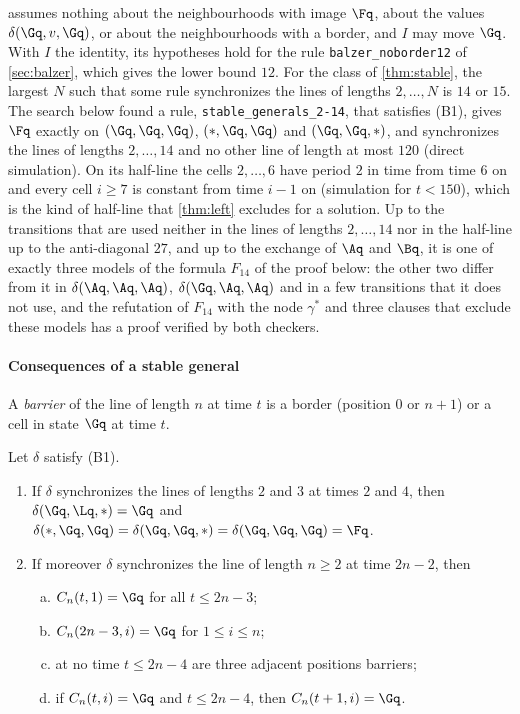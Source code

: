  assumes nothing about the neighbourhoods with image
$\Fq$, about the values $\delta(\Gq,v,\Gq)$, or about the neighbourhoods with a
border, and $I$ may move $\Gq$. With $I$ the identity, its hypotheses hold for the rule
\texttt{balzer\_noborder12} of \cref{sec:balzer}, which gives the lower bound
$12$. For the class of \cref{thm:stable}, the largest $N$ such that some rule
synchronizes the lines of lengths $2,\dots,N$ is $14$ or $15$. The search below
found a rule, \texttt{stable\_generals\_2-14},
that satisfies (B1), gives $\Fq$ exactly on $(\Gq,\Gq,\Gq)$, $(\ast,\Gq,\Gq)$
and $(\Gq,\Gq,\ast)$, and synchronizes the lines of lengths $2,\dots,14$ and no
other line of length at most $120$ (direct simulation). On its half-line the
cells $2,\dots,6$ have period $2$ in time from time $6$ on and every cell $i\ge7$
is constant from time $i-1$ on (simulation for $t<150$), which is the kind of
half-line that \cref{thm:left} excludes for a solution. Up to the transitions
that are used neither in the lines of lengths $2,\dots,14$ nor in the half-line
up to the anti-diagonal $27$, and up to the exchange of $\Aq$ and $\Bq$, it is one
of exactly three models of the formula $F_{14}$ of the proof below: the other
two differ from it in $\delta(\Aq,\Aq,\Aq)$, $\delta(\Gq,\Aq,\Aq)$ and in a few
transitions that it does not use, and the refutation of $F_{14}$ with the
node $\gamma^\ast$ and three clauses that exclude these models has a proof
verified by both checkers.

\paragraph{Consequences of a stable general}
A \emph{barrier} of the line of length $n$ at time $t$ is a border (position
$0$ or $n+1$) or a cell in state $\Gq$ at time $t$.

\begin{lemma}\label{lem:fire}
Let $\delta$ satisfy \textup{(B1)}.
\begin{enumerate}[(1)]
\item If $\delta$ synchronizes the lines of lengths $2$ and $3$ at times $2$ and
$4$, then $\delta(\Gq,\Lq,\ast)=\Gq$ and
$\delta(\ast,\Gq,\Gq)=\delta(\Gq,\Gq,\ast)=\delta(\Gq,\Gq,\Gq)=\Fq$.
\item If moreover $\delta$ synchronizes the line of length $n\ge2$ at time
$2n-2$, then
\begin{enumerate}[(a)]
\item $C_n(t,1)=\Gq$ for all $t\le2n-3$;
\item $C_n(2n-3,i)=\Gq$ for $1\le i\le n$;
\item at no time $t\le2n-4$ are three adjacent positions barriers;
\item if $C_n(t,i)=\Gq$ and $t\le2n-4$, then $C_n(t+1,i)=\Gq$.
\end{enumerate}
\end{enumerate}
\end{lemma}

